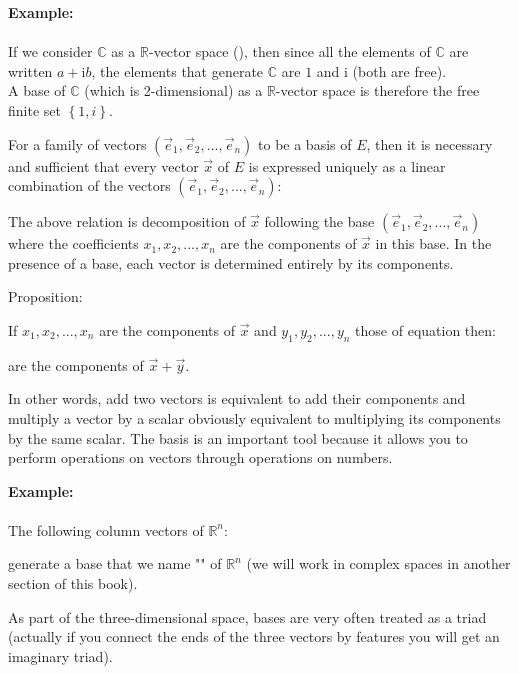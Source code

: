 	\begin{tcolorbox}[colframe=black,colback=white,sharp corners]
	\textbf{{\Large {}}Example:}\\\\
	If we consider $\mathbb{C}$ as a $\mathbb{R}$-vector space (), then since all the elements of $\mathbb{C}$ are written $a+\mathrm{i}b$, the elements that generate $\mathbb{C}$ are $1$ and $\mathrm{i}$ (both are free).\\
	
	A base of $\mathbb{C}$ (which is 2-dimensional) as a $\mathbb{R}$-vector space is therefore the free finite set $\left\lbrace 1, i \right\rbrace$.
	\end{tcolorbox}
	For a family of vectors $(\vec{e}_1,\vec{e}_2,...,\vec{e}_n)$ to be a basis of $E$, then it is necessary and sufficient that every vector $\vec{x}$ of $E$ is expressed uniquely as a linear combination of the vectors $(\vec{e}_1,\vec{e}_2,...,\vec{e}_n)$:
	
	The above relation is decomposition of $\vec{x}$ following the base $(\vec{e}_1,\vec{e}_2,...,\vec{e}_n)$ where the coefficients $x_1,x_2,...,x_n$ are the components of $\vec{x}$ in this base. In the presence of a base, each vector is determined entirely by its components.
	
	Proposition:
	
	If $x_1,x_2,...,x_n$ are the components of $\vec{x}$ and $y_1,y_2,...,y_n$ those of equation then: 
	
	are the components of $\vec{x}+\vec{y}$.
	
	In other words, add two vectors is equivalent to add their components and multiply a vector by a scalar obviously equivalent to multiplying its components by the same scalar. The basis is an important tool because it allows you to perform operations on vectors through operations on numbers.
	
	\begin{tcolorbox}[colframe=black,colback=white,sharp corners]
	\textbf{{\Large {}}Example:}\\\\
	The following column vectors of $\mathbb{R}^n$:
	
	generate a base that we name "\label{canonical basis}" of $\mathbb{R}^n$ (we will work in complex spaces in another section of this book).
	\end{tcolorbox}
	\begin{tcolorbox}[title=Remark,colframe=black,arc=10pt]
	As part of the three-dimensional space, bases are very often treated as a triad (actually if you connect the ends of the three vectors by features you will get an imaginary triad).
	\end{tcolorbox}	
	
